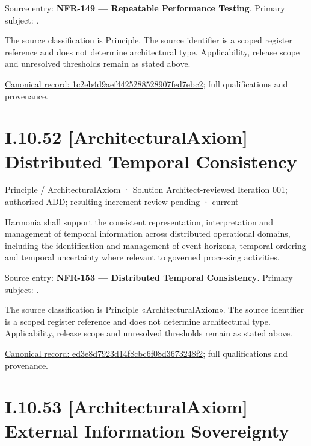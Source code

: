 Source entry: \textbf{NFR-149 — Repeatable Performance Testing}. Primary subject: \texttt{}.



The source classification is Principle. The source identifier is a scoped register reference and does not determine architectural type. Applicability, release scope and unresolved thresholds remain as stated above.


{\footnotesize \href{../../../../../../../continuum/motivation/principle/1c2eb4d9aef4425288528907fed7ebc2.md}{Canonical record: 1c2eb4d9aef4425288528907fed7ebc2}; full qualifications and provenance.}\par
\section*{I.10.52 [ArchitecturalAxiom] Distributed Temporal Consistency}
\label{navigation:I.10.52}

\label{element:ed3e8d7923d14f8cbc6f08d3673248f2}
{\small Principle / ArchitecturalAxiom · Solution Architect-reviewed Iteration 001; authorised ADD; resulting increment review pending · current}\par

Harmonia shall support the consistent representation, interpretation and management of temporal information across distributed operational domains, including the identification and management of event horizons, temporal ordering and temporal uncertainty where relevant to governed processing activities.



Source entry: \textbf{NFR-153 — Distributed Temporal Consistency}. Primary subject: \texttt{}.



The source classification is Principle «ArchitecturalAxiom». The source identifier is a scoped register reference and does not determine architectural type. Applicability, release scope and unresolved thresholds remain as stated above.


{\footnotesize \href{../../../../../../../continuum/motivation/principle/architectural-axiom/ed3e8d7923d14f8cbc6f08d3673248f2.md}{Canonical record: ed3e8d7923d14f8cbc6f08d3673248f2}; full qualifications and provenance.}\par
\section*{I.10.53 [ArchitecturalAxiom] External Information Sovereignty}
\label{navigation:I.10.53}

